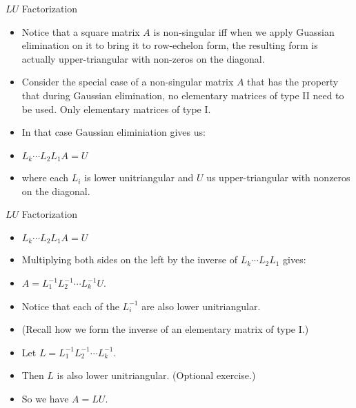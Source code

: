 \documentclass{beamer}
\begin{document}

\begin{frame}{$LU$ Factorization}

\begin{itemize}

\item Notice that a square matrix $A$ is non-singular iff when we apply
Guassian elimination on it to bring it to row-echelon form, the resulting
form is actually upper-triangular with non-zeros on the diagonal.

\item Consider the special case of a non-singular matrix $A$ that has the
property that during Gaussian elimination, no elementary matrices of
type II need to be used. Only elementary matrices of type I.

\item In that case Gaussian eliminiation gives us:

\item $L_k\cdots L_2 L_1 A = U$

\item where each $L_i$ is lower unitriangular and $U$ us upper-triangular with
nonzeros on the diagonal.

\end{itemize}

\end{frame}


\begin{frame}{$LU$ Factorization}

\begin{itemize}

\item $L_k\cdots L_2 L_1 A = U$

\item Multiplying both sides on the left by the inverse of $L_k\cdots L_2 L_1$ gives:

\item $A = L_1^{-1} L_2^{-1} \cdots L_k^{-1} U$.

\item Notice that each of the $L_i^{-1}$ are also lower unitriangular.
\item (Recall how we form the inverse of an elementary matrix of type I.)

\item Let $L = L_1^{-1} L_2^{-1} \cdots L_k^{-1}$.

\item Then $L$  is also lower unitriangular. (Optional exercise.)

\item So we have $A = LU$.

\end{itemize}

\end{frame}
\end{document}
